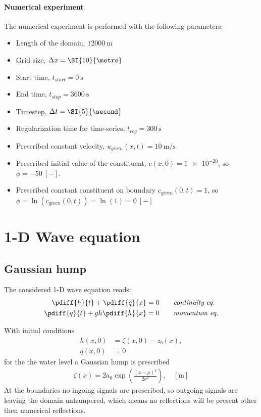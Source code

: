 \paragraph*{Numerical experiment}
The numerical experiment is performed with the following parameters:
\begin{itemize}
    \item Length of the domain, $\SI{12000}{\metre}$
    \item Grid size, $\Dx = \SI{10}{\metre}$
    \item Start time, $t_{start} = \SI{0}{\second}$
    \item End time, $t_{stop} = \SI{3600}{\second}$
    \item Timestep, $\Dt = \SI{5}{\second}$
    \item Regularization time for time-series, $t_{reg} = \SI{300}{\second}$
    \item Prescribed constant velocity, $u_{given}(x,t) = \SI{10}{\metre\per\second}$
    \item Prescribed initial value of the constituent, $c(x,0)= \num{1e-20}$, \newline so $\phi = \SI{-50}{[-]}$.
    \item Prescribed constant constituent on boundary $c_{given}(0,t) = 1$, \newline so $\phi = \ln(c_{given}(0,t)) = \ln(1) = \SI{0}{[-]}$
\end{itemize}
\section{1-D Wave equation}

\subsection{Gaussian hump}
The considered 1-D wave equation reads:
\begin{align}
    \pdiff{h}{t}  + \pdiff{q}{x} & = 0 \qquad \textit{continuity eq.} \\
    \pdiff{q}{t}  + g h \pdiff{h}{x} & = 0 \qquad \textit{momentum eq.}
\end{align}

With initial conditions
\begin{align}
    h(x,0) & = \zeta(x,0) - z_b(x),\\
    q(x,0) & = 0
\end{align}
for the the water level a Gaussian hump is prescribed
\begin{align}
    \zeta(x) = 2 a_0 \exp\left( \frac{(x - \mu)^2}{2\sigma^2}  \right), \quad [\si{\metre}]
\end{align}
At the boundaries no ingoing signals are prescribed, so outgoing signals are leaving the domain unhampered, which means no reflections will be present other then numerical reflections.

